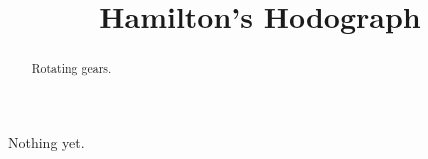 \documentclass{ximera}
\title{Hamilton's Hodograph}
\begin{document}
\begin{abstract}
Rotating gears.
\end{abstract}
\maketitle


Nothing yet.
\end{document}
